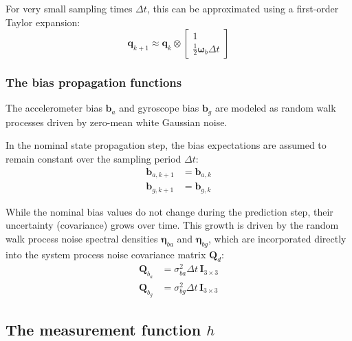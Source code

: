 \documentclass{article}
\begin{document}
	For very small sampling times $\Delta t$, this can be approximated using a first-order Taylor expansion:
	\begin{equation}
		\mathbf{q}_{k+1} \approx \mathbf{q}_k \otimes \begin{bmatrix} 1 \\ \frac{1}{2}\boldsymbol{\omega}_b \Delta t \end{bmatrix}
	\end{equation}
	
	\subsubsection{The bias propagation functions}
	The accelerometer bias $\mathbf{b}_a$ and gyroscope bias $\mathbf{b}_g$ are modeled as random walk processes driven by zero-mean white Gaussian noise. 
	
	In the nominal state propagation step, the bias expectations are assumed to remain constant over the sampling period $\Delta t$:
	\begin{align}
		\mathbf{b}_{a, k+1} &= \mathbf{b}_{a, k} \\
		\mathbf{b}_{g, k+1} &= \mathbf{b}_{g, k}
	\end{align}
	
	While the nominal bias values do not change during the prediction step, their uncertainty (covariance) grows over time. This growth is driven by the random walk process noise spectral densities $\boldsymbol{\eta}_{ba}$ and $\boldsymbol{\eta}_{bg}$, which are incorporated directly into the system process noise covariance matrix $\mathbf{Q}_d$:
	\begin{align}
		\mathbf{Q}_{b_a} &= \sigma_{ba}^2 \Delta t \, \mathbf{I}_{3\times3} \\
		\mathbf{Q}_{b_g} &= \sigma_{bg}^2 \Delta t \, \mathbf{I}_{3\times3}
	\end{align}
	
	\subsection{The measurement function $h$}
	
\end{document}
